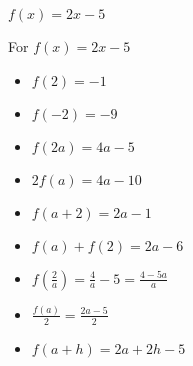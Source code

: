 {$f(x) = 2x-5$}
{For $f(x) = 2x-5$

\begin{itemize}
\item  $f(2) = -1$
\item  $f(-2) = -9$
\item  $f(2a) = 4a-5$
\item  $2 f(a) = 4a-10$
\item $f(a+2) = 2a-1$
\item $f(a) + f(2) = 2a-6$
\item  $f \left( \frac{2}{a} \right) = \frac{4}{a} - 5 = \frac{4-5a}{a}$
\item $\frac{f(a)}{2} =\frac{2a-5}{2}$
\item  $f(a + h) = 2a + 2h - 5$
\end{itemize}
}